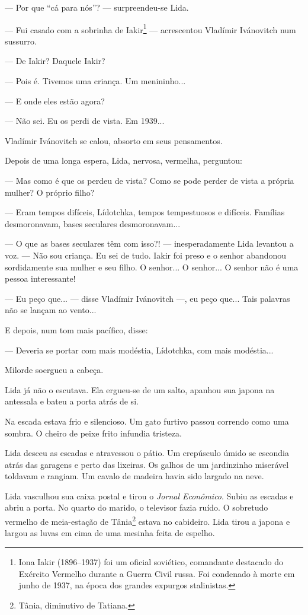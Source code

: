 --- Por que ``cá para nós''? --- surpreendeu-se Lida.

--- Fui casado com a sobrinha de Iakir\footnote{Iona Iakir (1896--1937)
  foi um oficial soviético, comandante destacado do Exército Vermelho
  durante a Guerra Civil russa. Foi condenado à morte em junho de 1937,
  na época dos grandes expurgos stalinistas.} --- acrescentou Vladímir
Ivánovitch num sussurro.

--- De Iakir? Daquele Iakir?

--- Pois é. Tivemos uma criança. Um menininho...

--- E onde eles estão agora?

--- Não sei. Eu os perdi de vista. Em 1939...

Vladímir Ivánovitch se calou, absorto em seus pensamentos.

Depois de uma longa espera, Lida, nervosa, vermelha, perguntou:

--- Mas como é que os perdeu de vista? Como se pode perder de vista a
própria mulher? O próprio filho?

--- Eram tempos difíceis, Lídotchka, tempos tempestuosos e difíceis.
Famílias desmoronavam, bases seculares desmoronavam...

--- O que as bases seculares têm com isso?! --- inesperadamente Lida
levantou a voz. --- Não sou criança. Eu sei de tudo. Iakir foi preso e o
senhor abandonou sordidamente sua mulher e seu filho. O senhor... O
senhor... O senhor não é uma pessoa interessante!

--- Eu peço que... --- disse Vladímir Ivánovitch ---, eu peço que...
Tais palavras não se lançam ao vento...

E depois, num tom mais pacífico, disse:

--- Deveria se portar com mais modéstia, Lídotchka, com mais modéstia...

Milorde soergueu a cabeça.

Lida já não o escutava. Ela ergueu-se de um salto, apanhou sua japona na
antessala e bateu a porta atrás de si.

Na escada estava frio e silencioso. Um gato furtivo passou correndo como
uma sombra. O cheiro de peixe frito infundia tristeza.

Lida desceu as escadas e atravessou o pátio. Um crepúsculo úmido se
escondia atrás das garagens e perto das lixeiras. Os galhos de um
jardinzinho miserável toldavam e rangiam. Um cavalo de madeira havia
sido largado na neve.

Lida vasculhou sua caixa postal e tirou o \emph{Jornal Econômico}. Subiu
as escadas e abriu a porta. No quarto do marido, o televisor fazia
ruído. O sobretudo vermelho de meia-estação de Tânia\footnote{Tânia,
  diminutivo de Tatiana.} estava no cabideiro. Lida tirou a japona e
largou as luvas em cima de uma mesinha feita de espelho.

